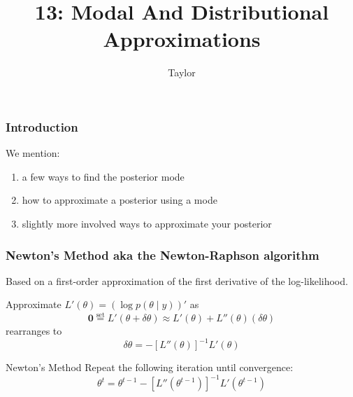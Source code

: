 \documentclass{beamer}
\title["13"]{13: Modal And Distributional Approximations}
\author{Taylor}
\institute[UVA] 
{
University of Virginia \\
\medskip
\textit{} 
}
\date{}
\begin{document}

\begin{frame}
\titlepage 
\end{frame}

\begin{frame}
\frametitle{Introduction}

We mention:
\begin{enumerate}
\item a few ways to find the posterior mode
\item how to approximate a posterior using a mode 
\item slightly more involved ways to approximate your posterior
\end{enumerate}



\end{frame}

\begin{frame}
\frametitle{Newton's Method aka the Newton-Raphson algorithm}

Based on a first-order approximation of the first derivative of the log-likelihood.
\newline

Approximate $L'(\theta) = (\log p(\theta \mid y))'$ as
$$
\mathbf{0} \overset{\text{set}}{=}  L'(\theta + \delta \theta) \approx L'(\theta ) + L''(\theta)(\delta \theta) 
$$
rearranges to 
$$
\delta \theta  =  - [L''(\theta)]^{-1} L'(\theta ) 
$$

\begin{block}{Newton's Method}
Repeat the following iteration until convergence:
\[
\theta^{t} = \theta^{t-1} - [L''(\theta^{t-1})]^{-1} L'(\theta^{t-1} ) 
\]
\end{block}

\end{frame}
\end{document}
